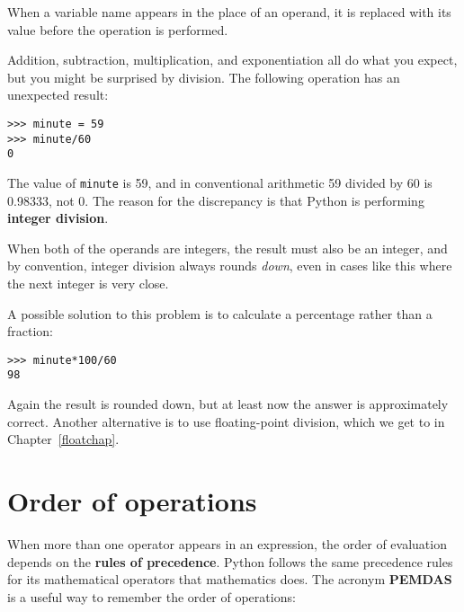 When a variable name appears in the place of an operand, it
is replaced with its value before the operation is
performed.

Addition, subtraction, multiplication, and exponentiation all do what
you expect, but you might be surprised by division.  The following
operation has an unexpected result:

\beforeverb
\begin{verbatim}
>>> minute = 59
>>> minute/60
0
\end{verbatim}
\afterverb
%
The value of {\tt minute} is 59, and in conventional arithmetic 59
divided by 60 is 0.98333, not 0.  The reason for the discrepancy is
that Python is performing {\bf integer division}.


When both of the operands are integers, the result must also be an integer,
and by convention, integer division always rounds {\em down}, even in cases
like this where the next integer is very close.

A possible solution to this problem is to calculate a percentage
rather than a fraction:

\beforeverb
\begin{verbatim}
>>> minute*100/60
98
\end{verbatim}
\afterverb
%
Again the result is rounded down, but at least now the answer is
approximately correct.  Another alternative is to use floating-point
division, which we get to in Chapter~\ref{floatchap}.


\section{Order of operations}

When more than one operator appears in an expression, the order of
evaluation depends on the {\bf rules of precedence}.  Python follows
the same precedence rules for its mathematical operators that
mathematics does.  The acronym {\bf PEMDAS} is a useful way to
remember the order of operations:

